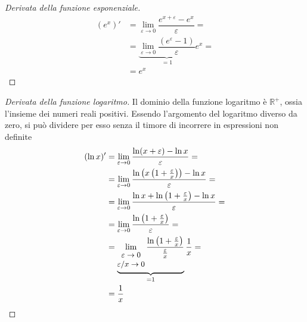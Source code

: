 \begin{proof}[Derivata della funzione esponenziale]
\begin{equation}
    \begin{aligned}
        (e^x)' 
        & = \lim_{\varepsilon \rightarrow 0 } \dfrac{e^{x+\varepsilon} - e^x}{\varepsilon} = \\
        & = \underbrace{\lim_{\varepsilon \rightarrow 0 } \dfrac{(e^{\varepsilon} - 1)}{\varepsilon}}_{= 1} e^{x} = \\
        & = e^x
    \end{aligned}
\end{equation}
\end{proof}
\begin{proof}[Derivata della funzione logaritmo] {\color{red} Il dominio della funzione logaritmo è $\mathbb{R}^+$, ossia l'insieme dei numeri reali positivi. Essendo l'argomento del logaritmo diverso da zero, si può dividere per esso senza il timore di incorrere in espressioni non definite}
\begin{equation}
    \begin{aligned}
        (\ln x)' 
        & = \lim_{\varepsilon \rightarrow 0 } \dfrac{\ln(x+\varepsilon) - \ln x}{\varepsilon} = \\
        & = \lim_{\varepsilon \rightarrow 0 } \dfrac{\ln \left( x\left( 1 + \frac{\varepsilon}{x} \right) \right) - \ln x}{\varepsilon} = \\
        & = \lim_{\varepsilon \rightarrow 0 } \dfrac{\ln  x + \ln \left( 1 + \frac{\varepsilon}{x}  \right) - \ln x}{\varepsilon} = \\
        & = \lim_{\varepsilon \rightarrow 0 } \dfrac{ \ln \left( 1 + \frac{\varepsilon}{x}  \right) }{\varepsilon} = \\
        & = \underbrace{\lim_{ \small\begin{matrix} \varepsilon \rightarrow 0 \\  \varepsilon / x \rightarrow 0  \end{matrix}} \dfrac{ \ln \left( 1 + \frac{\varepsilon}{x}  \right) }{\frac{\varepsilon}{x}}}_{=1} \dfrac{1}{x} = \\
        & = \dfrac{1}{x}
    \end{aligned}
\end{equation}
\end{proof}
